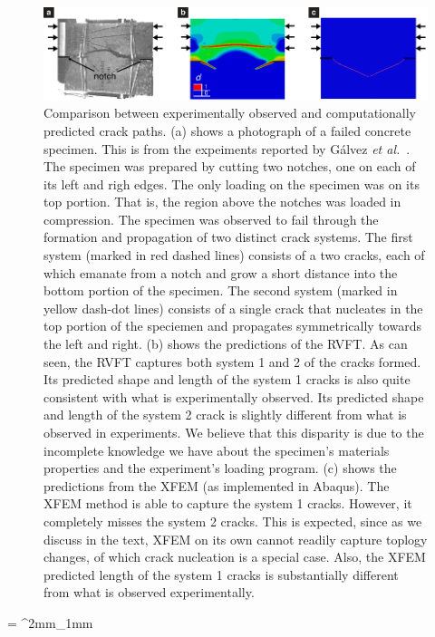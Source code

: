 \documentclass[10pt,letterpaper]{article}
\begin{document}
    \begin{figure}[t!]
      \centering
      \includegraphics[width=\textwidth]{Figures/XFEM/concrete_ver2.pdf}
      \caption{Comparison between experimentally observed and computationally predicted crack paths. (a) shows a photograph of a failed concrete specimen. This is from the expeiments reported by G{\'a}lvez \textit{et al.}~\cite{galvez1999fracture}.   The specimen was prepared by  cutting two notches, one  on each of its   left and righ edges.  The only loading on the specimen was on its  top portion. That is,   the region above the notches was loaded in compression. The specimen was observed to fail through the formation and  propagation of two distinct crack systems.  The first system   (marked in red dashed lines)  consists  of a two cracks, each of which  emanate  from a  notch and  grow a short distance into the  bottom portion of the specimen. The second system (marked in yellow dash-dot lines) consists  of a single crack that nucleates in the top portion of the speciemen and propagates symmetrically towards the left and right.  (b) shows the predictions of the RVFT.  As can  seen, the    RVFT captures both system 1 and 2 of the cracks formed. Its predicted shape and length of the  system 1 cracks is also quite consistent with what is experimentally observed.  Its  predicted shape and length of the system 2 crack is  slightly different from what is observed in experiments. We believe that this disparity is due to the incomplete knowledge we have about the specimen's materials properties and the experiment's loading program. (c) shows the predictions from the XFEM (as implemented in Abaqus). The XFEM method is able to capture the system 1 cracks. However, it completely misses the  system 2 cracks. This is expected, since as we discuss in the text, XFEM on its own cannot readily capture  toplogy changes, of which crack nucleation is a special case. Also, the XFEM predicted length of the  system 1 cracks is substantially  different from what is observed experimentally. }
      \label{f:xfem}
\end{figure}

%
\tabulinesep = ^2mm_1mm
\everyrow{\tabucline[.4mm  white]{}}
\end{document}

